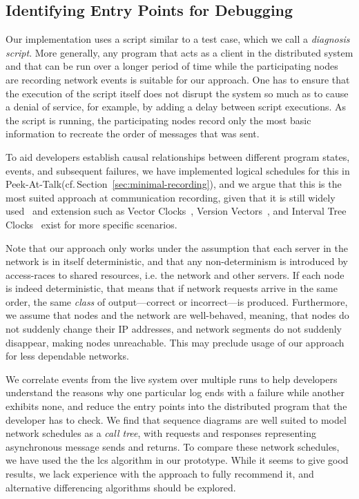 \documentclass[preprint,3p]{elsarticle}
\newcommand{\ac}[1]{\gls{#1}}
\newcommand{\cf}[1]{cf.\,{#1}\xspace}
\newcommand{\toolname}{Peek-At-Talk\xspace}
\begin{document}
\subsection{Identifying Entry Points for Debugging}

Our implementation uses a script similar to a test case, which we call a
\emph{diagnosis script}. More generally, any program that acts as a client in
the distributed system and that can be run over a longer period of time while
the participating nodes are recording network events is suitable for our
approach. One has to ensure that the execution of the script itself does not
disrupt the system so much as to cause a denial of service, for example, by
adding a delay between script executions. As the script is running, the
participating nodes record only the most basic information to recreate the order
of messages that was sent.

To aid developers establish causal relationships between different program
states, events, and subsequent failures, we have implemented logical schedules
for this in \toolname (\cf{Section~\ref{sec:minimal-recording}}), and we argue that
this is the most suited approach at communication recording, given that it is
still widely used~\cite{Konuru2000,Stanley2009,Geels2006Replay,altekar2009odr}
and extension such as Vector Clocks~\cite{Mattern1988}, Version
Vectors~\cite{Parker1983}, and Interval Tree Clocks~\cite{Paulo} exist for more
specific scenarios.

Note that our approach only works under the assumption that each server in the
network is in itself deterministic, and that any non-determinism is introduced
by access-races to shared resources, i.e. the network and other servers. If each
node is indeed deterministic, that means that if network requests arrive in the
same order, the same \emph{class} of output---correct or incorrect---is
produced. Furthermore, we assume that nodes and the network are well-behaved,
meaning, that nodes do not suddenly change their \textsc{IP} addresses, and
network segments do not suddenly disappear, making nodes unreachable. This may
preclude usage of our approach for less dependable networks.

We correlate events from the live system over multiple runs to help developers
understand the reasons why one particular log ends with a failure while another
exhibits none, and reduce the entry points into the distributed program that the
developer has to check. We find that sequence diagrams are well suited to model
network schedules as a \emph{call tree}, with requests and responses
representing asynchronous message sends and returns. To compare these network
schedules, we have used the the \ac{lcs} algorithm in our prototype. While it
seems to give good results, we lack experience with the approach to fully
recommend it, and alternative differencing algorithms should be explored.
\end{document}
